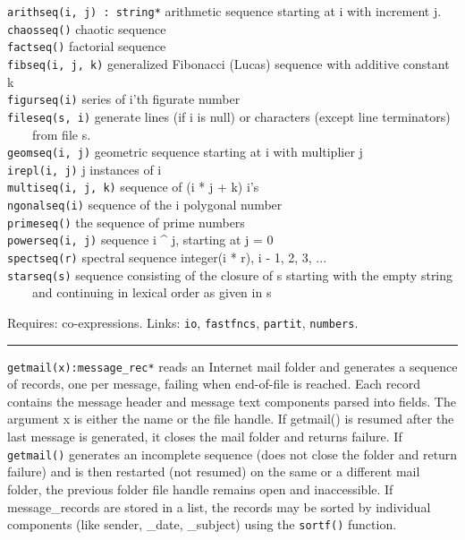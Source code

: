 \texttt{arithseq(i, j) : string*} arithmetic sequence starting at i with
increment j.\\
\texttt{chaosseq()} chaotic sequence\\
\texttt{factseq()} factorial sequence\\
\texttt{fibseq(i, j, k)} generalized Fibonacci (Lucas) sequence with
additive constant k\\
\texttt{figurseq(i)} series of i'th figurate
number\\
\texttt{fileseq(s, i)} generate lines (if i is null) or characters
(except line terminators)\\
 \ \ \ \ from file s.\\
\texttt{geomseq(i, j)} geometric sequence starting at i with multiplier
j\\
\texttt{irepl(i, j)} j instances of i\\
\texttt{multiseq(i, j, k)} sequence of (i * j + k)
i's\\
\texttt{ngonalseq(i)} sequence of the i polygonal number\\
\texttt{primeseq()} the sequence of prime numbers\\
\texttt{powerseq(i, j)} sequence i \^{} j, starting at j = 0\\
\texttt{spectseq(r)} spectral sequence integer(i * r), i - 1, 2, 3,
...\\
\texttt{starseq(s)} sequence consisting of the closure of s starting
with the empty string\\
 \ \ \ \ and continuing in lexical order as given in s

Requires: co-expressions. Links: \texttt{io}, \texttt{fastfncs},
\texttt{partit}, \texttt{numbers}. 

\vspace{0.25cm}\hrule{}

\texttt{getmail(x):message\_rec*} reads an Internet mail folder and generates a sequence of records, one per message,
failing when end-of-file is reached. Each record contains the message
header and message text components parsed into fields. The argument x
is either the name or the file handle. If getmail() is resumed after
the last message is generated, it closes the mail folder and returns
failure. If \texttt{getmail()} generates an incomplete sequence (does
not close the folder and return failure) and is then restarted (not
resumed) on the same or a different mail folder, the previous folder
file handle remains open and inaccessible. If message\_records are
stored in a list, the records may be sorted by individual components
(like sender, \_date, \_subject) using the \texttt{sortf()} function.


